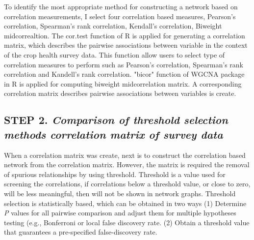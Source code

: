 To identify the most appropriate method for constructing a network based on correlation measurements, I select four correlation based measures, Pearson's correlation, Spearman's rank correlation, Kendall's correlation, Biweight midcorrealtion. The cor.test function of R  is applied for generating a correlation matrix, which describes the pairwise associations between variable in the context of the crop health survey data. This function allow users to select type of correlation measures to perform such as Pearson's correlation, Spearman's rank correlation and Kandell's rank correlation. "bicor" function of WGCNA package  in R is applied for computing biweight midcorrelation matrix. A corresponding correlation matrix describes pairwise associations between variables is create. %

\subsection*{\textbf{STEP 2. }\textit{Comparison of threshold selection methods correlation matrix of survey data}} 

When a correlation matrix was create, next is to construct the correlation based network from the correlation matrix. However, the matrix is required the removal of spurious relationships by using threshold. Threshold is a value used for screening the correlations, if correlations  below a threshold value, or close to zero, will be less meaningful, then will not be shown in network graphs. Threshold selection is statistically based, which can be obtained in two ways (1) Determine \textit{P} values for all pairwise comparison and adjust them for multiple hypotheses testing (e.g., Bonferroni or local false discovery rate. (2) Obtain a threshold value that guarantees a pre-specified false-discovery rate.

